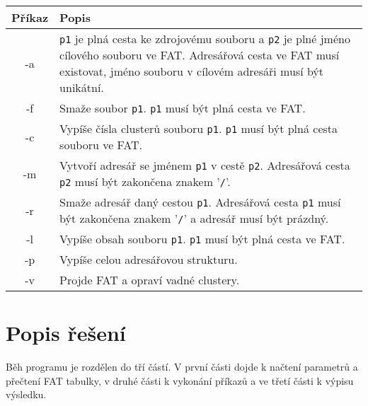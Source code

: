 \documentclass[11pt,a4paper]{scrartcl}
\begin{document}
	\begin{center}
		\begin{tabular}{|c|p{13cm}|}
			\hline
			Příkaz & Popis \\
			\hline
			-a & \verb|p1| je plná cesta ke zdrojovému souboru a \verb|p2| je plné jméno cílového souboru ve FAT. Adresářová cesta ve FAT musí existovat, jméno souboru v cílovém adresáři musí být unikátní.\\
			
			\hline
			
			-f & Smaže soubor \verb|p1|. \verb|p1| musí být plná cesta ve FAT. \\
			
			\hline
			
			-c & Vypíše čísla clusterů souboru \verb|p1|. \verb|p1| musí být plná cesta souboru ve FAT. \\
			
			\hline
			
			-m & Vytvoří adresář se jménem \verb|p1| v cestě \verb|p2|. Adresářová cesta \verb|p2| musí být zakončena znakem '\verb|/|'. \\
			
			\hline
			
			-r & Smaže adresář daný cestou \verb|p1|. Adresářová cesta \verb|p1| musí být zakončena znakem '\verb|/|' a adresář musí být prázdný. \\
			
			\hline
			
			-l & Vypíše obsah souboru \verb|p1|. \verb|p1| musí být plná cesta ve FAT. \\
			
			\hline
			
			-p & Vypíše celou adresářovou strukturu. \\
			
			\hline
			
			-v & Projde FAT a opraví vadné clustery. \\
			
			\hline
		\end{tabular}
	\end{center}
	
	\section{Popis řešení}
	Běh programu je rozdělen do tří částí. V první části dojde k načtení parametrů a přečtení FAT tabulky, v druhé části k vykonání příkazů a ve třetí části k výpisu výsledku.
	
\end{document}
